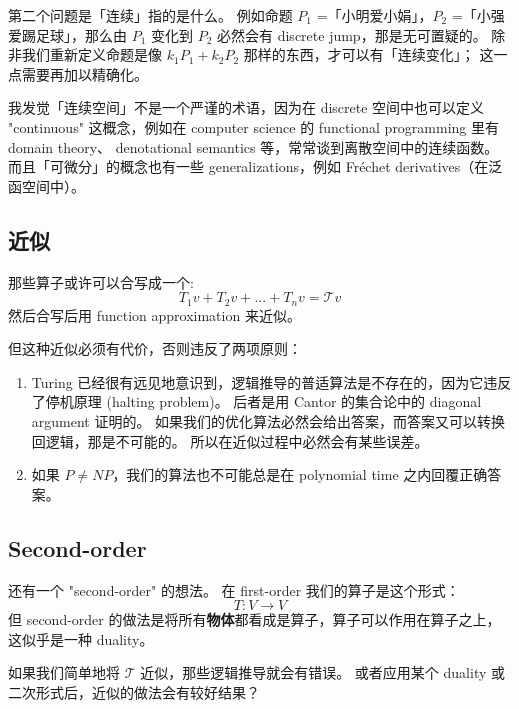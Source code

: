\documentclass[12pt]{article}
\begin{document}
第二个问题是「连续」指的是什么。 例如命题 $P_1$ =「小明爱小娟」，$P_2$ =「小强爱踢足球」，那么由 $P_1$ 变化到 $P_2$ 必然会有 discrete jump，那是无可置疑的。 除非我们重新定义命题是像 $k_1 P_1+ k_2 P_2$ 那样的东西，才可以有「连续变化」；  这一点需要再加以精确化。

我发觉「连续空间」不是一个严谨的术语，因为在 discrete 空间中也可以定义 "continuous" 这概念，例如在 computer science 的 functional programming 里有 domain theory、 denotational semantics 等，常常谈到离散空间中的连续函数。 而且「可微分」的概念也有一些 generalizations，例如 Fr\'{e}chet derivatives（在泛函空间中）。

\subsection{近似}

那些算子或许可以合写成一个:
$$ T_1 v + T_2 v + ... + T_n v = \mathcal{T} v $$
然后合写后用 function approximation 来近似。

但这种近似必须有代价，否则违反了两项原则：
\begin{enumerate}
\item Turing 已经很有远见地意识到，逻辑推导的普适算法是不存在的，因为它违反了停机原理 (halting problem)。 后者是用 Cantor 的集合论中的 diagonal argument 证明的。 如果我们的优化算法必然会给出答案，而答案又可以转换回逻辑，那是不可能的。 所以在近似过程中必然会有某些误差。
\item 如果 $P \neq NP$，我们的算法也不可能总是在 polynomial time 之内回覆正确答案。
\end{enumerate}

\subsection{Second-order}

还有一个 "second-order" 的想法。  在 first-order 我们的算子是这个形式：
$$ T: V \rightarrow V $$  
但 second-order 的做法是将所有\textbf{物体}都看成是算子，算子可以作用在算子之上，这似乎是一种 duality。 

如果我们简单地将 $\mathcal{T}$ 近似，那些逻辑推导就会有错误。  或者应用某个 duality 或二次形式后，近似的做法会有较好结果？
\end{document}
